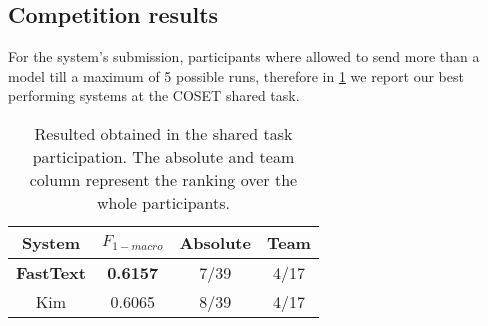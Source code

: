 \subsection{Competition results} \label{subsec:results}

For the system's submission, participants where allowed to send more than a model till a maximum of 5 possible runs, therefore in \cref{tab:results} we report our best performing systems at the COSET shared task.

\begin{table}[h]
\footnotesize
\caption{Resulted obtained in the shared task participation. The absolute and team column represent the ranking over the whole participants.}
\label{tab:results}
\centering
\begin{tabular}{c|c|c|c}
\toprule
\hline
System		& $F_{1-macro}$		& Absolute	& Team	\\
\hline
\textbf{FastText}	& \textbf{0.6157}	& 7/39	& 4/17 \\
Kim			& 0.6065	& 8/39	& 4/17\\
\hline
\bottomrule
\end{tabular}
\end{table}